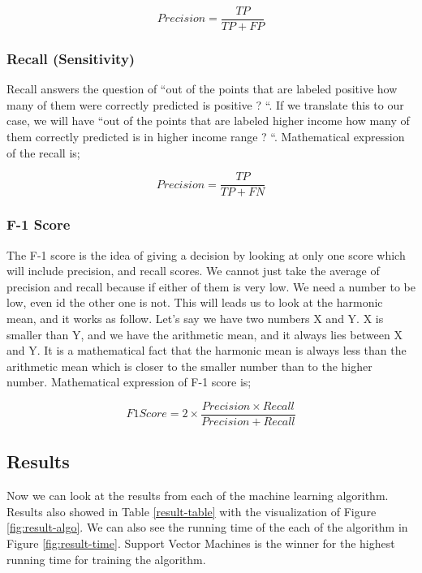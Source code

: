 \documentclass[sigconf]{acmart}
\begin{document}
\begin{equation}
Precision = \frac{TP} {TP + FP}
\end{equation}

\subsubsection{\textbf{Recall (Sensitivity)}}

Recall answers the question of ``out of the points that are labeled positive how many of them were correctly predicted is positive ? ``. If we translate this to our case, we will have ``out of the points that are labeled higher income how many of them correctly predicted is in higher income range ? ``. Mathematical expression of the recall is; 

\begin{equation}
Precision = \frac{TP} {TP + FN}
\end{equation}

\subsubsection{\textbf{F-1 Score}}

The F-1 score is the idea of giving a decision by looking at only one score which will include precision, and recall scores. We cannot just take the average of precision and recall because if either of them is very low. We need a number to be low, even id the other one is not. This will leads us to look at the harmonic mean, and it works as follow. Let's say we have two numbers X and Y. X is smaller than Y, and we have the arithmetic mean, and it always lies between X and Y. It is a mathematical fact that the harmonic mean is always less than the arithmetic mean which is closer to the smaller number than to the higher number. Mathematical expression of F-1 score is; 

\begin{equation}
F1 Score = 2 \times {\frac{Precision \times Recall} {Precision + Recall}}
\end{equation}

\subsection{Results}
Now we can look at the results from each of the machine learning algorithm. Results also showed in Table \ref{result-table} with the visualization of Figure \ref{fig:result-algo}. We can also see the running time of the each of the algorithm in Figure \ref{fig:result-time}. Support Vector Machines is the winner for the highest running time for training the algorithm. 
\end{document}
